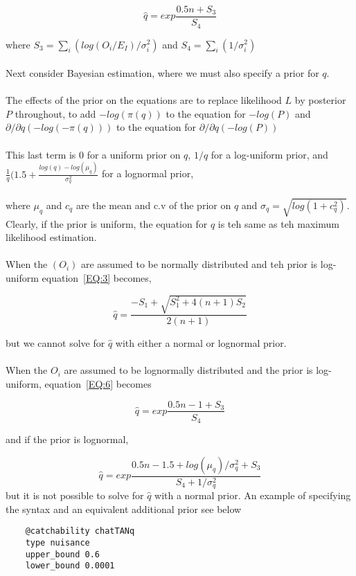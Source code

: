{{{{\begin{equation}\label{EQ:6}
\hat q = exp\frac{0.5n + S_3}{S_4} 
\end{equation}

where $S_3 = \sum_i (log(O_i /E_I)/\sigma_i^2)$ and $S_4 = \sum_i(1/\sigma_i^2)$ 
\\\\
Next consider Bayesian estimation, where we must also specify a prior for $q$.
\\\\
The effects of the prior on the equations are to replace likelihood $L$ by posterior $P$ throughout, to add $-log(\pi(q))$ to the equation for $-log(P)$ and $\partial/\partial q(-log(-\pi(q)))$ to the equation for $\partial/\partial q(-log(P))$
\\\\
This last term is 0 for a uniform prior on $q$, $1/q$ for a log-uniform prior, and $\frac{1}{q}\bigg( 1.5 + \frac{log(q) - log(\mu_q)}{\sigma_q^2}$ for a lognormal prior, 
\\\\
where $\mu_q$ and $c_q$ are the mean and c.v of the prior on $q$ and $\sigma_q = \sqrt{log(1+c_q^2)}$. Clearly, if the prior is uniform, the equation for $\hat q$ is teh same as teh maximum likelihood estimation.
\\\\
When the $(O_i)$ are assumed to be normally distributed and teh prior is log-uniform equation~\eqref{EQ:3} becomes,

\begin{equation}\label{EQ:7}
\hat q = \frac{-S_1 + \sqrt{S_1^2 + 4(n + 1)S_2}}{2(n+1)} 
\end{equation}

but we cannot solve for $\hat q$ with either a normal or lognormal prior.
\\\\
When the $O_i$ are assumed to be lognormally distributed and the prior is log-uniform, equation~\eqref{EQ:6} becomes 


\begin{equation}\label{EQ:8}
\hat q = exp\frac{0.5n -1 + S_3}{S_4} 
\end{equation}

and if the prior is lognormal,

\begin{equation}\label{EQ:9}
\hat q = exp\frac{0.5n -1.5 + log(\mu_q)/\sigma_q^2 + S_3}{S_4 + 1 / \sigma_q^2} 
\end{equation}
but it is not possible to solve for $\hat q$ with a normal prior. An example of specifying the syntax and an equivalent additional prior see below
{\small{\begin{verbatim}
	@catchability chatTANq
	type nuisance
	upper_bound 0.6
	lower_bound 0.0001
	

\end{verbatim}}}}}}}
